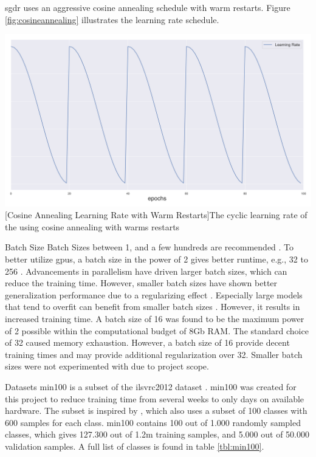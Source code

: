 \begin{enumdescript}
\begin{enumdescript}
		\gls{sgdr} uses an aggressive cosine annealing schedule with warm restarts. Figure \ref{fig:cosineannealing} illustrates the learning rate schedule.
		
		\begin{minipage}[t]{\linewidth}
			\centering
			\includegraphics[width=.7\linewidth]{figures/lr.png}
			[Cosine Annealing Learning Rate with Warm Restarts]{The cyclic learning rate of the using cosine annealing with warms restarts} 
			\label{fig:cosineannealing}
		\end{minipage}
		
		\item[Batch Size] Batch Sizes between 1, and a few hundreds are recommended \cite{bengio_practical_2012}. To better utilize \gls{gpu}s, a batch size in the power of 2 gives better runtime, e.g., 32 to 256 \cite{goodfellow_deep_2016}. Advancements in parallelism \cite{dean_large_2012} have driven larger batch sizes, which can reduce the training time. However, smaller batch sizes have shown better generalization performance due to a regularizing effect \cite{masters_revisiting_nodate}. Especially large models that tend to overfit can benefit from smaller batch sizes \cite{goodfellow_deep_2016}. However, it results in increased training time.
		A batch size of 16 was found to be the maximum power of 2 possible within the computational budget of 8Gb RAM. The standard choice of 32 caused memory exhaustion. However, a batch size of 16 provide decent training times and may provide additional regularization over 32. Smaller batch sizes were not experimented with due to project scope.
		
		\item[Datasets] \gls{min100} is a subset of the \gls{ilsvrc2012} dataset \cite{russakovsky_imagenet_2015}. \gls{min100} was created for this project to reduce training time from several weeks to only days on available hardware. The subset is inspired by \cite{vinyals_matching_2016}, which also uses a subset of 100 classes with 600 samples for each class. \gls{min100} contains 100 out of 1.000 randomly sampled classes, which gives 127.300 out of 1.2m training samples, and 5.000 out of 50.000 validation samples. A full list of classes is found in table \ref{tbl:min100}. 
		

\end{enumdescript}
\end{enumdescript}
